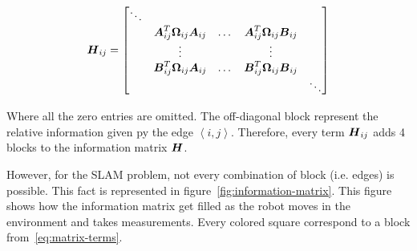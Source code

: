 \begin{equation}
\boldsymbol{H}_{ij} = \begin{bmatrix}
\ddots & & & & \\
& \boldsymbol{A}_{ij}^T \boldsymbol{\Omega}_{ij}\boldsymbol{A}_{ij} & \dots & 
\boldsymbol{A}_{ij}^T \boldsymbol{\Omega}_{ij}\boldsymbol{B}_{ij} & \\
& \vdots & & \vdots & \\
& \boldsymbol{B}_{ij}^T \boldsymbol{\Omega}_{ij}\boldsymbol{A}_{ij} & \dots & 
\boldsymbol{B}_{ij}^T \boldsymbol{\Omega}_{ij}\boldsymbol{B}_{ij} & \\
& & & & \ddots
\end{bmatrix}
\label{eq:matrix-terms}
\end{equation}

Where all the zero entries are omitted. The off-diagonal block represent the relative information given py the edge $\left\langle i,j\right\rangle$. Therefore, every term $\boldsymbol{H}_{ij}$ adds 4 blocks to the information matrix $\boldsymbol{H}$.

However, for the SLAM problem, not every combination of block (i.e. edges) is possible. This fact is represented in figure~\ref{fig:information-matrix}. This figure shows how the information matrix get filled as the robot moves in the environment and takes measurements. Every colored square correspond to a block from~\eqref{eq:matrix-terms}. 

